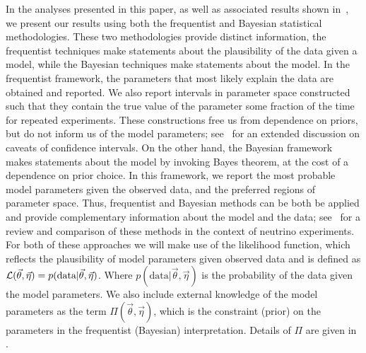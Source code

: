 In the analyses presented in this paper, as well as associated results shown in~\cite{HESEFLV,HESEDM, HESEXS}, we present our results using both the frequentist and Bayesian statistical methodologies.
These two methodologies provide distinct information, the frequentist techniques make statements about the plausibility of the data given a model, while the Bayesian techniques make statements about the model.
In the frequentist framework, the parameters that most likely explain the data are obtained and reported.
We also report intervals in parameter space constructed such that they contain the true value of the parameter some fraction of the time for repeated experiments.
These constructions free us from dependence on priors, but do not inform us of the model parameters; see~\cite{Biller:2014eya} for an extended discussion on caveats of confidence intervals.
On the other hand, the Bayesian framework makes statements about the model by invoking Bayes theorem, at the cost of a dependence on prior choice.
In this framework, we report the most probable model parameters given the observed data, and the preferred regions of parameter space.
Thus, frequentist and Bayesian methods can be both be applied and provide complementary information about the model and the data; see~\cite{Diaz:2019fwt} for a review and comparison of these methods in the context of neutrino experiments.
For both of these approaches we will make use of the likelihood function, which reflects the plausibility of model parameters given observed data and is defined as $\mathcal{L}(\vec\theta, \vec\eta) = p(\textrm{data}|\vec\theta, \vec\eta)$.
Where $p(\textrm{data}|\vec\theta, \vec\eta)$ is the probability of the data given the model parameters.
We also include external knowledge of the model parameters as the term $\Pi(\vec\theta, \vec\eta)$, which is the constraint (prior) on the parameters in the frequentist (Bayesian) interpretation.
Details of $\Pi$ are given in .

